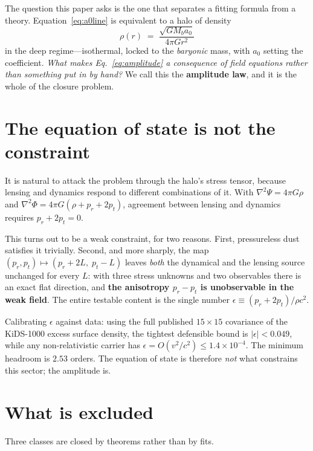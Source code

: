 \documentclass[aps,prd,twocolumn,superscriptaddress,nofootinbib,floatfix]{revtex4-2}
\begin{document}
The question this paper asks is the one that separates a fitting formula from a theory.
Equation~\eqref{eq:a0line} is equivalent to a halo of density
\begin{equation}
\rho(r) \;=\; \frac{\sqrt{G M_b a_0}}{4\pi G r^2}
\label{eq:amplitude}
\end{equation}
in the deep regime---isothermal, locked to the \emph{baryonic} mass, with $a_0$ setting
the coefficient. \emph{What makes Eq.~\eqref{eq:amplitude} a consequence of field
equations rather than something put in by hand?} We call this the \textbf{amplitude
law}, and it is the whole of the closure problem.

\section{The equation of state is not the constraint}

It is natural to attack the problem through the halo's stress tensor, because lensing
and dynamics respond to different combinations of it. With
$\nabla^2\Psi = 4\pi G\rho$ and $\nabla^2\Phi = 4\pi G(\rho + p_r + 2p_t)$, agreement
between lensing and dynamics requires $p_r + 2p_t = 0$.

This turns out to be a weak constraint, for two reasons. First, pressureless dust
satisfies it trivially. Second, and more sharply, the map
$(p_r,p_t)\mapsto(p_r+2L,\;p_t-L)$ leaves \emph{both} the dynamical and the lensing
source unchanged for every $L$: with three stress unknowns and two observables there is
an exact flat direction, and \textbf{the anisotropy $p_r-p_t$ is unobservable in the
weak field}. The entire testable content is the single number
$\epsilon \equiv (p_r+2p_t)/\rho c^2$.

Calibrating $\epsilon$ against data: using the full published $15\times15$ covariance of
the KiDS-1000 excess surface density, the tightest defensible bound is
$|\epsilon| < 0.049$, while any non-relativistic carrier has
$\epsilon = O(v^2/c^2) \le 1.4\times10^{-4}$. The minimum headroom is $2.53$ orders. The
equation of state is therefore \emph{not} what constrains this sector; the amplitude is.

\section{What is excluded}

Three classes are closed by theorems rather than by fits.
\end{document}

